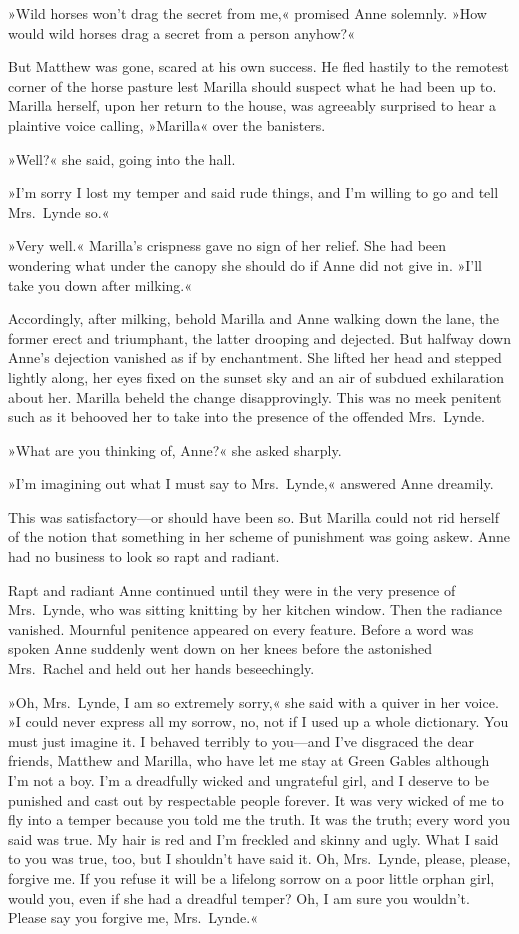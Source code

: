 »Wild horses won't drag the secret from me,« promised Anne solemnly. »How would wild horses drag a secret from a person anyhow?«

But Matthew was gone, scared at his own success. He fled hastily to the remotest corner of the horse pasture lest Marilla should suspect what he had been up to. Marilla herself, upon her return to the house, was agreeably surprised to hear a plaintive voice calling, »Marilla« over the banisters.

»Well?« she said, going into the hall.

»I'm sorry I lost my temper and said rude things, and I'm willing to go and tell Mrs.~Lynde so.«

»Very well.« Marilla's crispness gave no sign of her relief. She had been wondering what under the canopy she should do if Anne did not give in. »I'll take you down after milking.«

Accordingly, after milking, behold Marilla and Anne walking down the lane, the former erect and triumphant, the latter drooping and dejected. But halfway down Anne's dejection vanished as if by enchantment. She lifted her head and stepped lightly along, her eyes fixed on the sunset sky and an air of subdued exhilaration about her. Marilla beheld the change disapprovingly. This was no meek penitent such as it behooved her to take into the presence of the offended Mrs.~Lynde.

»What are you thinking of, Anne?« she asked sharply.

»I'm imagining out what I must say to Mrs.~Lynde,« answered Anne dreamily.

This was satisfactory—or should have been so. But Marilla could not rid herself of the notion that something in her scheme of punishment was going askew. Anne had no business to look so rapt and radiant.

Rapt and radiant Anne continued until they were in the very presence of Mrs.~Lynde, who was sitting knitting by her kitchen window. Then the radiance vanished. Mournful penitence appeared on every feature. Before a word was spoken Anne suddenly went down on her knees before the astonished Mrs.~Rachel and held out her hands beseechingly.

»Oh, Mrs.~Lynde, I am so extremely sorry,« she said with a quiver in her voice. »I could never express all my sorrow, no, not if I used up a whole dictionary. You must just imagine it. I behaved terribly to you—and I've disgraced the dear friends, Matthew and Marilla, who have let me stay at Green Gables although I'm not a boy. I'm a dreadfully wicked and ungrateful girl, and I deserve to be punished and cast out by respectable people forever. It was very wicked of me to fly into a temper because you told me the truth. It was the truth; every word you said was true. My hair is red and I'm freckled and skinny and ugly. What I said to you was true, too, but I shouldn't have said it. Oh, Mrs.~Lynde, please, please, forgive me. If you refuse it will be a lifelong sorrow on a poor little orphan girl, would you, even if she had a dreadful temper? Oh, I am sure you wouldn't. Please say you forgive me, Mrs.~Lynde.«

